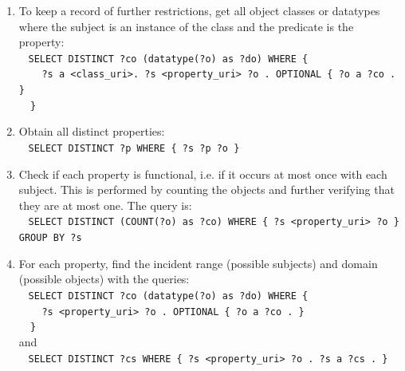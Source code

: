 \documentclass[journal,article,submit,moreauthors,pdftex]{Definitions/mdpi}
\newcommand{\textttt}[1] {\texttt{\footnotesize#1}}
\newcommand{\h} {\hphantom ~ }
\begin{document}
\begin{enumerate}[leftmargin=0cm]
{	\h\h ?s a <class\_uri> . ?s <property\_uri> ?o . ?o a ?oc .\\
        \h\h FILTER(str(?oc) != 'object\_curi')\\
        \h\}}\\
       When \textttt{?cs} is 0, a universal restriction is found. 
\item To keep a record of further restrictions, get all object classes or datatypes where the subject is an instance of the class and the predicate is the property:\\
	\h\textttt{SELECT DISTINCT ?co (datatype(?o) as ?do) WHERE \{\\
        \h\h ?s a <class\_uri>. ?s <property\_uri> ?o . OPTIONAL \{ ?o a ?co . \}\\
        \h\}}
    \item Obtain all distinct properties:\\
        \h\textttt{SELECT DISTINCT ?p WHERE \{ ?s ?p ?o \}}
    \item Check if each property is functional, i.e. if it
        occurs at most once with each subject.
        This is performed by counting the objects and further verifying
        that they are at most one. The query is:\\
        \h\textttt{SELECT DISTINCT (COUNT(?o) as ?co) WHERE \{ ?s
            <property\_uri> ?o \} GROUP BY ?s}
          \item For each property, find the incident range (possible subjects) and domain (possible objects) with the
        queries:\\
        \h\textttt{SELECT DISTINCT ?co (datatype(?o) as ?do) WHERE \{\\
        \h\h ?s <property\_uri> ?o . OPTIONAL \{ ?o a ?co . \}\\
        \h\}} \\
        and \\
        \h\textttt{SELECT DISTINCT ?cs WHERE \{ ?s <property\_uri> ?o . ?s a ?cs . \}}

\end{enumerate}
\end{document}
